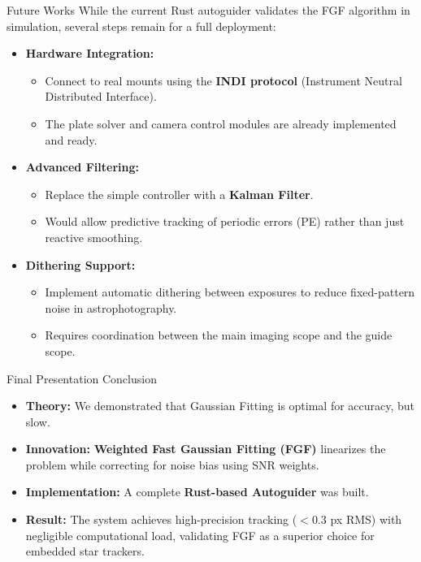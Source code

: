 \begin{frame}{Future Works}
    While the current Rust autoguider validates the FGF algorithm in simulation, several steps remain for a full deployment:

    \begin{itemize}
        \item \textbf{Hardware Integration:}
        \begin{itemize}
            \item Connect to real mounts using the \textbf{INDI protocol} (Instrument Neutral Distributed Interface).
            \item The plate solver and camera control modules are already implemented and ready.
        \end{itemize}

        \item \textbf{Advanced Filtering:}
        \begin{itemize}
            \item Replace the simple controller with a \textbf{Kalman Filter}.
            \item Would allow predictive tracking of periodic errors (PE) rather than just reactive smoothing.
        \end{itemize}

        \item \textbf{Dithering Support:}
        \begin{itemize}
            \item Implement automatic dithering between exposures to reduce fixed-pattern noise in astrophotography.
            \item Requires coordination between the main imaging scope and the guide scope.
        \end{itemize}
        
    \end{itemize}
\end{frame}

\begin{frame}{Final Presentation Conclusion}
    \begin{itemize}
        \item \textbf{Theory:} We demonstrated that Gaussian Fitting is optimal for accuracy, but slow.
        \item \textbf{Innovation:} \textbf{Weighted Fast Gaussian Fitting (FGF)} linearizes the problem while correcting for noise bias using SNR weights.
        \item \textbf{Implementation:} A complete \textbf{Rust-based Autoguider} was built.
        \item \textbf{Result:} The system achieves high-precision tracking ($< 0.3$ px RMS) with negligible computational load, validating FGF as a superior choice for embedded star trackers.
    \end{itemize}
\end{frame}

